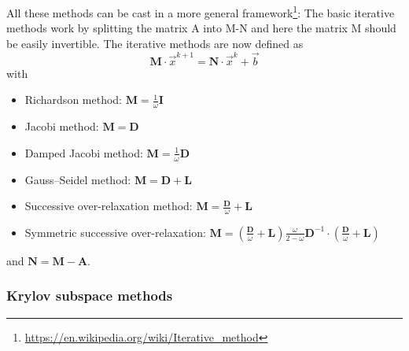 

All these methods can be cast in a more general framework\footnote{
\url{https://en.wikipedia.org/wiki/Iterative_method}}: 
The basic iterative methods work by splitting the matrix A into M-N 
and here the matrix M should be easily invertible. The iterative methods are now defined as 
\begin{equation}
{\bm M} \cdot \vec{x}^{k+1} = {\bm N}\cdot \vec{x}^k + \vec{b}
\end{equation}
with 
\begin{itemize}
\item Richardson method: ${\bm M}=\frac{1}{\omega} {\bm I}$
\item Jacobi method: ${\bm M}={\bm D}$
\item Damped Jacobi method: ${\bm M}=\frac{1}{\omega}{\bm D}$
\item Gauss–Seidel method: ${\bm M}={\bm D} + {\bm L}$
\item Successive over-relaxation method: ${\bm M} = \frac{\bm D}{\omega}+{\bm L}$
\item Symmetric successive over-relaxation:  ${\bm M} = \left(\frac{\bm D}{\omega}+{\bm L}\right) \frac{\omega}{2-\omega} {\bm D}^{-1}\cdot \left(\frac{\bm D}{\omega}+ {\bm L} \right)$
\end{itemize}
and ${\bm N}={\bm M}-{\bm A}$.

\subsubsection{Krylov subspace methods}

